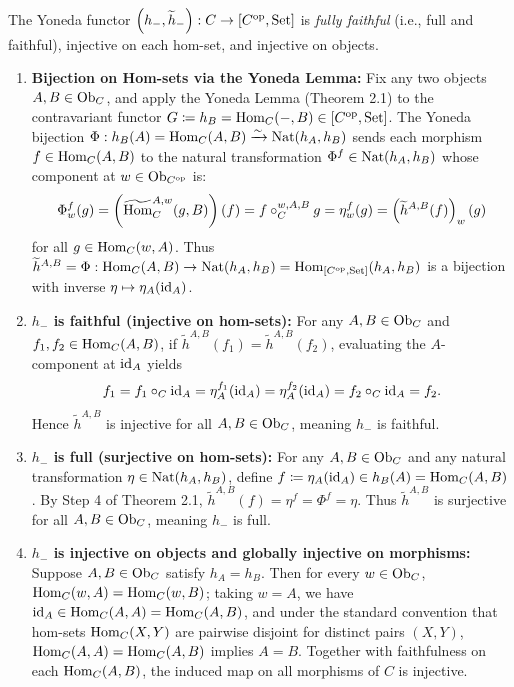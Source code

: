 \documentclass[10pt,a4paper]{article}
\begin{document}
\begin{theorem}
The Yoneda functor $\left(h_-, \widetilde{h}_-\right) : C \to [C^{\textrm{op}}, {\textrm{Set}}]$ is \emph{fully faithful} (i.e., full and faithful), injective on each hom-set, and injective on objects.
\end{theorem}
\myprf
\begin{enumerate}
\item \textbf{Bijection on Hom-sets via the Yoneda Lemma:}
Fix any two objects $A, B \in {\textrm{Ob}}_C$, and apply the Yoneda Lemma (Theorem 2.1) to the contravariant functor $G \coloneqq h_B = {\textrm{Hom}}_C(-,B) \in [C^{\textrm{op}}, {\textrm{Set}}]$.
The Yoneda bijection $\Phi : h_B(A) = {\textrm{Hom}}_C(A,B) \xrightarrow{\sim} {\textrm{Nat}}(h_A, h_B)$ sends each morphism $f \in {\textrm{Hom}}_C(A,B)$ to the natural transformation $\Phi^f \in {\textrm{Nat}}(h_A, h_B)$ whose component at $w \in {\textrm{Ob}}_{C^{\textrm{op}}}$ is:
$$\Phi^f_w(g) = \left({\widetilde{{\textrm{Hom}}}\textrm{}}_C^{A,w}(g, B)\right)(f) = f \circ_C^{w,A,B} g = \eta^f_w(g) = \left(\widetilde{h}^{A,B}(f)\right)_w(g)$$
for all $g \in {\textrm{Hom}}_C(w,A)$. Thus $\widetilde{h}^{A,B} = \Phi : {\textrm{Hom}}_C(A,B) \to {\textrm{Nat}}(h_A, h_B) = {\textrm{Hom}}_{[C^{\textrm{op}},{\textrm{Set}}]}(h_A, h_B)$ is a bijection with inverse $\eta \mapsto \eta_A({\textrm{id}}_A)$.

\item \textbf{$h_-$ is faithful (injective on hom-sets):}
For any $A, B \in {\textrm{Ob}}_C$ and $f_1, f_2 \in {\textrm{Hom}}_C(A,B)$, if $\widetilde{h}^{A,B}(f_1) = \widetilde{h}^{A,B}(f_2)$, evaluating the $A$-component at ${\textrm{id}}_A$ yields
$$f_1 = f_1 \circ_C {\textrm{id}}_A = \eta^{f_1}_A({\textrm{id}}_A) = \eta^{f_2}_A({\textrm{id}}_A) = f_2 \circ_C {\textrm{id}}_A = f_2.$$
Hence $\widetilde{h}^{A,B}$ is injective for all $A,B \in {\textrm{Ob}}_C$, meaning $h_-$ is faithful.

\item \textbf{$h_-$ is full (surjective on hom-sets):}
For any $A, B \in {\textrm{Ob}}_C$ and any natural transformation $\eta \in {\textrm{Nat}}(h_A, h_B)$, define $f \coloneqq \eta_A({\textrm{id}}_A) \in h_B(A) = {\textrm{Hom}}_C(A,B)$. By Step 4 of Theorem 2.1, $\widetilde{h}^{A,B}(f) = \eta^f = \Phi^f = \eta$. Thus $\widetilde{h}^{A,B}$ is surjective for all $A,B \in {\textrm{Ob}}_C$, meaning $h_-$ is full.

\item \textbf{$h_-$ is injective on objects and globally injective on morphisms:}
Suppose $A, B \in {\textrm{Ob}}_C$ satisfy $h_A = h_B$. Then for every $w \in {\textrm{Ob}}_C$, ${\textrm{Hom}}_C(w,A) = {\textrm{Hom}}_C(w,B)$; taking $w = A$, we have ${\textrm{id}}_A \in {\textrm{Hom}}_C(A,A) = {\textrm{Hom}}_C(A,B)$, and under the standard convention that hom-sets ${\textrm{Hom}}_C(X,Y)$ are pairwise disjoint for distinct pairs $(X,Y)$, ${\textrm{Hom}}_C(A,A) = {\textrm{Hom}}_C(A,B)$ implies $A = B$. Together with faithfulness on each ${\textrm{Hom}}_C(A,B)$, the induced map on all morphisms of $C$ is injective.
\end{enumerate}
\myqed
\end{document}
